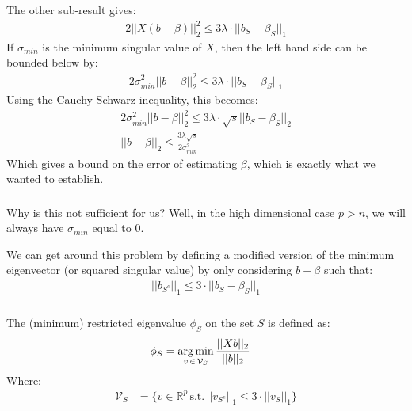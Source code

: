\begin{frame}[fragile] \frametitle{}

The other sub-result gives:
\begin{align*}
2 || X (b - \beta) ||_2^2 \leq 3 \lambda \cdot || b_S - \beta_S ||_1
\end{align*}
\pause If $\sigma_{min}$ is the minimum singular value of $X$, then the
left hand side can be bounded below by:
\begin{align*}
2 \sigma^2_{min} || b - \beta ||_2^2 \leq 3 \lambda \cdot || b_S - \beta_S ||_1
\end{align*}
\pause Using the Cauchy-Schwarz inequality, this becomes:
\begin{align*}
2 \sigma^2_{min} || b - \beta ||_2^2 \leq 3 \lambda \cdot \sqrt{s} || b_S - \beta_S ||_2\\
|| b - \beta ||_2 \leq \frac{3 \lambda \sqrt{s}}{2\sigma^2_{min}}
\end{align*}
Which gives a bound on the error of estimating $\beta$, which is exactly what we wanted
to establish.

\end{frame}

\begin{frame}[fragile] \frametitle{}

Why is this not sufficient for us? Well, in the high dimensional case $p > n$, we will
always have $\sigma_{min}$ equal to $0$.

\pause We can get around this problem by defining a modified version of the minimum
eigenvector (or squared singular value) by only considering $b - \beta$ such that:
\begin{align*}
|| b_{S^c} ||_1 \leq 3 \cdot || b_S - \beta_S ||_1
\end{align*}

\end{frame}

\begin{frame}[fragile] \frametitle{}

The (minimum) restricted eigenvalue $\phi_S$ on the set $S$ is defined as:
\begin{align*}
\phi_S &= \mathop{\mathrm{arg\,min}}_{v \, \in \, \mathcal{V}_S} \frac{|| X b ||_2}{|| b ||_2}
\end{align*}
Where:
\begin{align*}
\mathcal{V}_S &= \{ v \in \mathbb{R}^p \, \text{s.t.} \, || v_{S^c} ||_1 \leq 3 \cdot || v_S ||_1  \}
\end{align*}

\end{frame}

